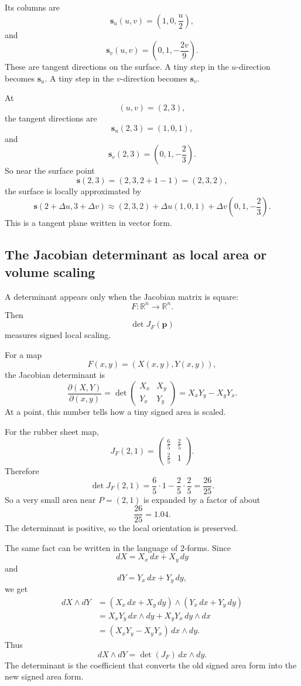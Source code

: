 Its columns are
\[
    \mathbf s_u(u,v)=
    \left(1,0,\frac{u}{2}\right),
\]
and
\[
    \mathbf s_v(u,v)=
    \left(0,1,-\frac{2v}{9}\right).
\]
These are tangent directions on the surface.  A tiny step in the \(u\)-direction becomes
\(\mathbf s_u\).  A tiny step in the \(v\)-direction becomes \(\mathbf s_v\).

At
\[
    (u,v)=(2,3),
\]
the tangent directions are
\[
    \mathbf s_u(2,3)=(1,0,1),
\]
and
\[
    \mathbf s_v(2,3)=\left(0,1,-\frac23\right).
\]
So near the surface point
\[
    \mathbf s(2,3)=
    \left(2,3,2+1-1\right)=(2,3,2),
\]
the surface is locally approximated by
\[
\boxed{
    \mathbf s(2+\Delta u,3+\Delta v)
    \approx
    (2,3,2)
    +
    \Delta u(1,0,1)
    +
    \Delta v\left(0,1,-\frac23\right).
}
\]
This is a tangent plane written in vector form.

\subsection{The Jacobian determinant as local area or volume scaling}

A determinant appears only when the Jacobian matrix is square:
\[
    F:\mathbb R^n\to\mathbb R^n.
\]
Then
\[
    \det J_F(\mathbf p)
\]
measures signed local scaling.

For a map
\[
    F(x,y)=(X(x,y),Y(x,y)),
\]
the Jacobian determinant is
\[
\boxed{
    \frac{\partial(X,Y)}{\partial(x,y)}
    =
    \det
    \begin{pmatrix}
        X_x & X_y\\
        Y_x & Y_y
    \end{pmatrix}
    =
    X_xY_y-X_yY_x.
}
\]
At a point, this number tells how a tiny signed area is scaled.

For the rubber sheet map,
\[
    J_F(2,1)
    =
    \begin{pmatrix}
        \frac65 & \frac25\\[1mm]
        \frac25 & 1
    \end{pmatrix}.
\]
Therefore
\[
\boxed{
    \det J_F(2,1)
    =
    \frac65\cdot1-\frac25\cdot\frac25
    =
    \frac{26}{25}.
}
\]
So a very small area near \(P=(2,1)\) is expanded by a factor of about
\[
    \frac{26}{25}=1.04.
\]
The determinant is positive, so the local orientation is preserved.

The same fact can be written in the language of \(2\)-forms.  Since
\[
    dX=X_x\,dx+X_y\,dy
\]
and
\[
    dY=Y_x\,dx+Y_y\,dy,
\]
we get
\[
\begin{aligned}
dX\wedge dY
&=
(X_x\,dx+X_y\,dy)\wedge(Y_x\,dx+Y_y\,dy)\\
&=
X_xY_y\,dx\wedge dy+X_yY_x\,dy\wedge dx\\
&=
(X_xY_y-X_yY_x)\,dx\wedge dy.
\end{aligned}
\]
Thus
\[
\boxed{
    dX\wedge dY
    =
    \det(J_F)\,dx\wedge dy.
}
\]
The determinant is the coefficient that converts the old signed area form into the new
signed area form.

